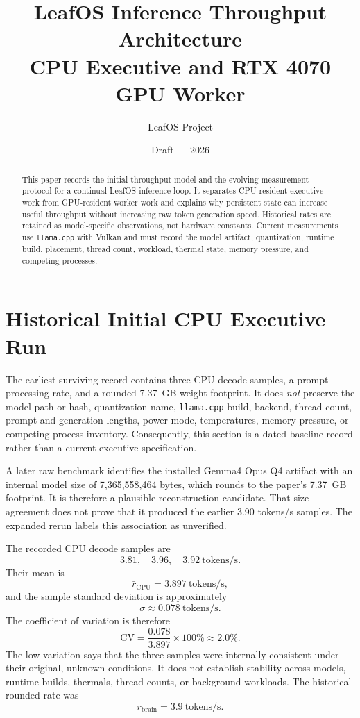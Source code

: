 \documentclass[11pt]{article}
\title{LeafOS Inference Throughput Architecture\\\large CPU Executive and RTX 4070 GPU Worker}
\author{LeafOS Project}
\date{Draft --- 2026}
\begin{document}
\maketitle

\begin{abstract}
This paper records the initial throughput model and the evolving measurement protocol for a continual LeafOS inference loop. It separates CPU-resident executive work from GPU-resident worker work and explains why persistent state can increase useful throughput without increasing raw token generation speed. Historical rates are retained as model-specific observations, not hardware constants. Current measurements use \texttt{llama.cpp} with Vulkan and must record the model artifact, quantization, runtime build, placement, thread count, workload, thermal state, memory pressure, and competing processes.
\end{abstract}

\section{Historical Initial CPU Executive Run}

The earliest surviving record contains three CPU decode samples, a prompt-processing rate, and a rounded 7.37~GB weight footprint. It does \emph{not} preserve the model path or hash, quantization name, \texttt{llama.cpp} build, backend, thread count, prompt and generation lengths, power mode, temperatures, memory pressure, or competing-process inventory. Consequently, this section is a dated baseline record rather than a current executive specification.

A later raw benchmark identifies the installed Gemma4 Opus Q4 artifact with an internal model size of 7,365,558,464 bytes, which rounds to the paper's 7.37~GB footprint. It is therefore a plausible reconstruction candidate. That size agreement does not prove that it produced the earlier 3.90 tokens/s samples. The expanded rerun labels this association as unverified.

The recorded CPU decode samples are
\[
3.81,\quad 3.96,\quad 3.92\ \text{tokens/s}.
\]
Their mean is
\[
\bar r_{\mathrm{CPU}} = 3.897\ \text{tokens/s},
\]
and the sample standard deviation is approximately
\[
\sigma \approx 0.078\ \text{tokens/s}.
\]
The coefficient of variation is therefore
\[
\mathrm{CV} = \frac{0.078}{3.897} \times 100\% \approx 2.0\%.
\]
The low variation says that the three samples were internally consistent under their original, unknown conditions. It does not establish stability across models, runtime builds, thermals, thread counts, or background workloads. The historical rounded rate was
\[
r_{\mathrm{brain}} = 3.9\ \text{tokens/s}.
\]
\end{document}
